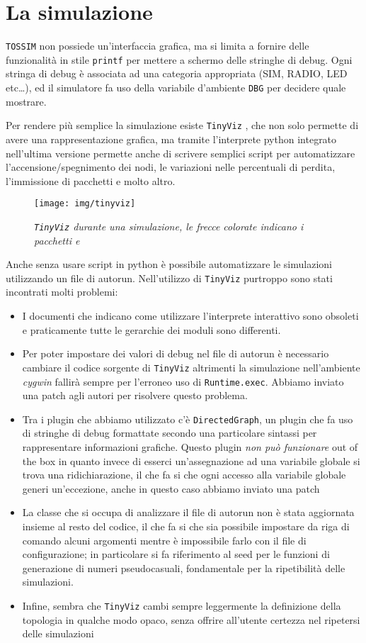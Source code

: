 \documentclass[twoside,11pt,a4paper,italian,openany]{book}
\newcommand{\tv}{\texttt{TinyViz} }
\newcommand{\tos}{\texttt{TOSSIM} }
\begin{document}
\section{La simulazione}

\tos non possiede un'interfaccia grafica, ma si limita a fornire delle funzionalità in stile 
\texttt{printf} per mettere a schermo delle stringhe di debug. 
Ogni stringa di debug è associata ad una categoria appropriata (SIM, RADIO, LED etc\ldots), 
ed il simulatore fa uso della variabile d'ambiente \texttt{DBG} per decidere quale mostrare. 

Per rendere più semplice la simulazione esiste \tv, che non solo permette di avere una 
rappresentazione grafica, ma tramite l'interprete python integrato nell'ultima versione 
permette anche di scrivere semplici script per automatizzare l'accensione/spegnimento dei nodi,
le variazioni nelle percentuali di perdita, l'immissione di pacchetti e molto altro. 
\begin{figure}
\texttt{[image: img/tinyviz]}
\caption{\emph{\tv durante una simulazione, le frecce colorate indicano i pacchetti \ack e \req}}
\end{figure}
Anche senza usare script in python è possibile automatizzare le simulazioni utilizzando un file 
di autorun.
Nell'utilizzo di \tv purtroppo sono stati incontrati molti problemi:
\begin{itemize}
\item{I documenti che indicano come utilizzare l'interprete interattivo sono obsoleti e 
praticamente tutte le gerarchie dei moduli sono differenti.}
\item{Per poter impostare dei valori di debug nel file di autorun è necessario  
cambiare il codice sorgente di \tv altrimenti la simulazione nell'ambiente \emph{cygwin} 
fallirà sempre per l'erroneo uso di \texttt{Runtime.exec}. Abbiamo inviato una patch 
agli autori per risolvere questo problema.}
\item{Tra i plugin  che abbiamo utilizzato c'è \texttt{DirectedGraph}, un plugin che fa uso 
di stringhe di debug formattate secondo una particolare sintassi per rappresentare informazioni 
grafiche. Questo plugin \emph{non può funzionare} out of the box in quanto invece di esserci 
un'assegnazione ad una variabile globale si trova una ridichiarazione, il che fa si che 
ogni accesso alla variabile globale generi un'eccezione, anche in questo caso abbiamo inviato una patch}
\item{La classe che si occupa di analizzare il file di autorun non è stata aggiornata insieme 
al resto del codice, il che fa si che sia possibile impostare da riga di comando alcuni 
argomenti mentre è impossibile farlo con il file di configurazione; 
in particolare si fa riferimento al seed per le funzioni di generazione di numeri pseudocasuali, 
fondamentale per la ripetibilità delle simulazioni.}
\item{Infine, sembra che \tv cambi sempre leggermente la definizione della topologia in qualche modo opaco, senza offrire all'utente certezza nel ripetersi delle simulazioni}
\end{itemize}
\end{document}
